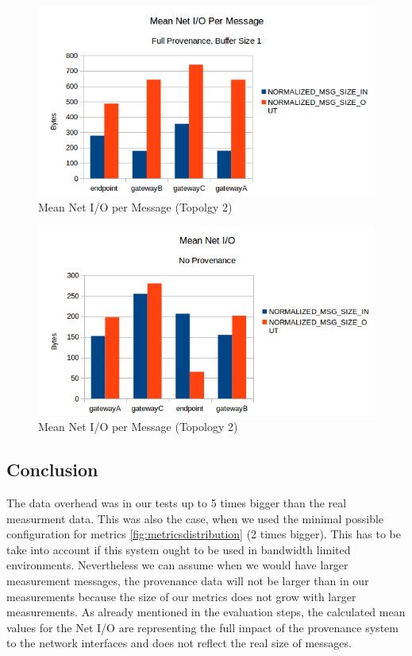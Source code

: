\begin{figure}[H]
	\center
	\includegraphics[width=\textwidth]{figures/overheaddiagram5.png}
	\caption{Mean Net I/O per Message (Topolgy 2)}
	\label{fig:overhrad5}
\end{figure}

\begin{figure}[H]
	\center
	\includegraphics[width=\textwidth]{figures/overheaddiagram6.png}
	\caption{Mean Net I/O per Message (Topology 2)}
	\label{fig:overhead6}
\end{figure}


\subsection{Conclusion}
The data overhead was in our tests up to 5 times bigger than the real measurment data. This was also the case, when we used the minimal possible configuration for metrics \ref{fig:metricsdistribution} (2 times bigger).
This has to be take into account if this system ought to be used in bandwidth limited environments.
Nevertheless we can assume when we would have larger measurement messages, the provenance data will not be larger than in our measurements because the size of our metrics does not grow with larger measurements.
As already mentioned in the evaluation steps, the calculated mean values for the Net I/O are representing the full impact of the provenance system to the network interfaces and does not reflect the real size of messages.
